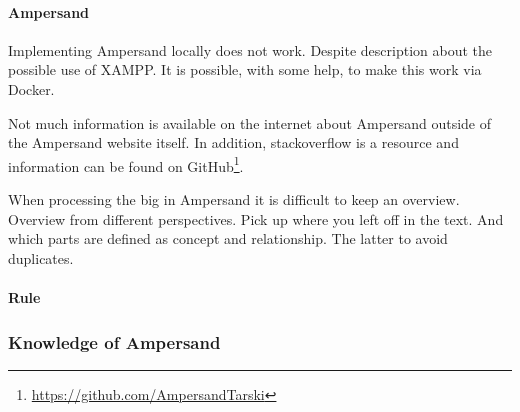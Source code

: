 \paragraph{Ampersand}
Implementing Ampersand locally does not work.
Despite description about the possible use of XAMPP.
It is possible, with some help, to make this work via Docker.

Not much information is available on the internet about Ampersand outside of the Ampersand website itself.
In addition, stackoverflow is a resource and information can be found on GitHub\footnote{\url{https://github.com/AmpersandTarski}}.

When processing the \acrshort{big} in Ampersand it is difficult to keep an overview.
Overview from different perspectives.
Pick up where you left off in the text.
And which parts are defined as concept and relationship.
The latter to avoid duplicates.


\paragraph{Rule}


\subsubsection{Knowledge of Ampersand}
\begin{comment}
- wat zijn de exacte waarnemingen geweest!
plaats hier de afgehandelde items.


\end{comment}









